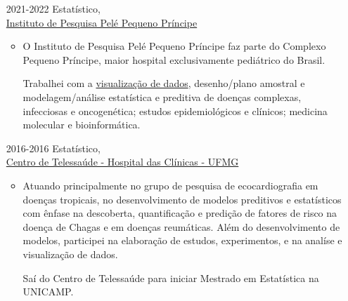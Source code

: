 \documentclass[12pt]{article}
\begin{document}
\newpage
\begin{itemize}
  \item[2021-2022] Estat\'{i}stico,\\
              \href{http://www.pelepequenoprincipe.org.br/}{\color{blue}
                  Instituto de Pesquisa Pel\'{e} Pequeno Pr\'{i}ncipe}
  \begin{itemize}
  \item O Instituto de Pesquisa Pel\'{e} Pequeno Pr\'{i}ncipe faz parte
        do Complexo Pequeno Pr\'{i}ncipe, maior hospital exclusivamente
        pedi\'{a}trico do Brasil.

        Trabalhei com a
        \href{https://henriquelaureano.github.io/visualizations/}{\color{blue}visualiza\c{c}\~{a}o de dados},
        desenho/plano amostral e modelagem/an\'{a}lise estat\'{i}stica e
        preditiva de doen\c{c}as complexas, infecciosas e
        oncogen\'{e}tica; estudos epidemiol\'{o}gicos e cl\'{i}nicos;
        medicina molecular e bioinform\'{a}tica.
  \end{itemize}

 \item[2016-2016] Estat\'{i}stico,\\
                  \href{https://telessaude.hc.ufmg.br/}{\color{blue}
                    Centro de Telessa\'{u}de -
                    Hospital das Cl\'{i}nicas - UFMG}
  \begin{itemize}
   \item Atuando principalmente no grupo de pesquisa de ecocardiografia
         em doen\c{c}as tropicais, no desenvolvimento de modelos
         preditivos e estat\'{i}sticos com \^{e}nfase na descoberta,
         quantifica\c{c}\~{a}o e predi\c{c}\~{a}o de fatores de risco na
         doen\c{c}a de Chagas e em doen\c{c}as reum\'{a}ticas. Al\'{e}m
         do desenvolvimento de modelos, participei na elabora\c{c}\~{a}o
         de estudos, experimentos, e na anal\'{i}se e
         visualiza\c{c}\~{a}o de dados.

         Sa\'{i} do Centro de Telessa\'{u}de para iniciar Mestrado em
         Estat\'{i}stica na UNICAMP.
  \end{itemize}
\end{itemize}
\end{document}
